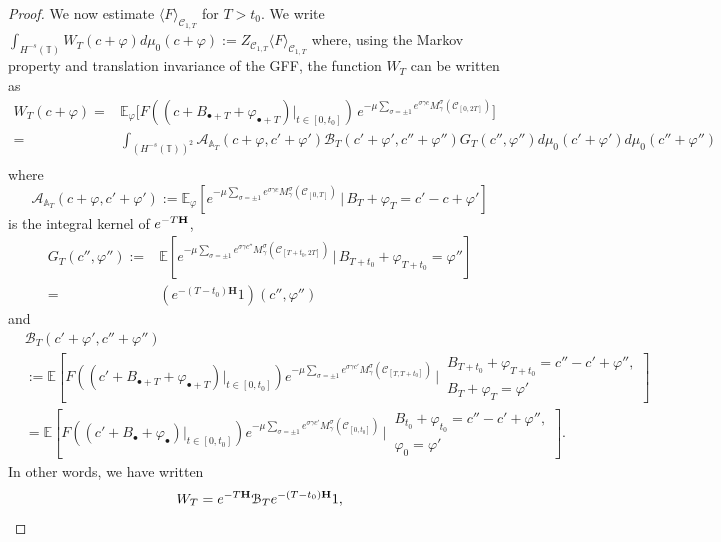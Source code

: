 \documentclass[11pt]{amsart}
\numberwithin{equation}{section}
\theoremstyle{definition}
\newcommand{\A}{\mathbb{A}}
\renewcommand{\H}{\mathbb{H}}
\def\H{\mathbf{H}}
\def\E{\mathbb{E}}
\newcommand{\mc}{\mathcal}
\def\T{\mathbb{T}}
\begin{document}
\begin{proof}
We now estimate $\langle F \rangle_{\mc{C}_{1,T}}$ for $T>t_0$. We write $\int_{H^{-s}(\T)}W_T(c+\varphi)d\mu_0(c+\varphi):=Z_{\mc{C}_{1,T}}\langle F \rangle_{\mc{C}_{1,T}}$ where, using the Markov property and translation invariance of the GFF, the function $W_T$ can be  written as 
\begin{align}\label{eq: constr 1}
W_T(c+\varphi)=&
\E_{\varphi}\Big[F((c+B_{\bullet+T}+\varphi_{\bullet+T})|_{t\in [0,t_0]}) \,  e^{-\mu \sum_{\sigma = \pm 1}e^{\sigma\gamma c} M_\gamma^\sigma(\mc{C}_{[0,2T]})} ]\\
=& \int_{(H^{-s}(\T))^2}\mc{A}_{\A_T}(c+\varphi,c'+\varphi')\mc{B}_T(c'+\varphi',c''+\varphi'')G_T(c'',\varphi'')d\mu_0(c'+\varphi')d\mu_0(c''+\varphi'')\\
\end{align}
where 
\[ \mc{A}_{\A_T}(c+\varphi,c'+\varphi'):=\E_\varphi [e^{-\mu \sum_{\sigma = \pm 1}e^{\sigma\gamma c} M_\gamma^\sigma(\mc{C}_{[0,T]})}\,|\, B_T+\varphi_T=c'-c+\varphi']\]
is the integral kernel of $e^{-T{\bf H}}$, 
\[ \begin{split}
G_T(c'',\varphi''):=&\E[e^{-\mu \sum_{\sigma = \pm 1}e^{\sigma\gamma c''} M_\gamma^\sigma(\mc{C}_{[T+t_0,2T]})}\,|\, B_{T+t_0}+\varphi_{T+t_0}=\varphi'']\\
=& (e^{-(T-t_0)\H}1)(c'',\varphi'')
\end{split}\]
and 
\begin{align*}
& \mc{B}_T(c'+\varphi',c''+\varphi'')\\
& :=\E\left[ F((c'+B_{\bullet+T}+\varphi_{\bullet+T})|_{t\in [0,t_0]})
e^{-\mu \sum_{\sigma = \pm 1}e^{\sigma\gamma c'} M_\gamma^\sigma(\mc{C}_{[T,T+t_0]})}\,\Bigg|\, 
\begin{array}{l}
B_{T+t_0}+\varphi_{T+t_0}=c''-c'+\varphi'',\\
B_T+\varphi_T=\varphi' \end{array}\right]\\
&= \mathbb E\left[ F((c'+B_\bullet+\varphi_{\bullet})|_{t\in [0,t_0]})
e^{-\mu \sum_{\sigma = \pm 1}e^{\sigma\gamma c'} M_\gamma^\sigma(\mc{C}_{[0,t_0]})}\,\Bigg|\, 
\begin{array}{l}
B_{t_0}+\varphi_{t_0}=c''-c'+\varphi'',\\
\varphi_{0}=\varphi' \end{array}\right].
\end{align*}
In other words, we have written 
\begin{equation}\label{rewrittingWT}
W_T=e^{-T{\bf H}}\mc{B}_Te^{-(T-t_0){\bf H}}1,
\end{equation}

\end{proof}
\end{document}
